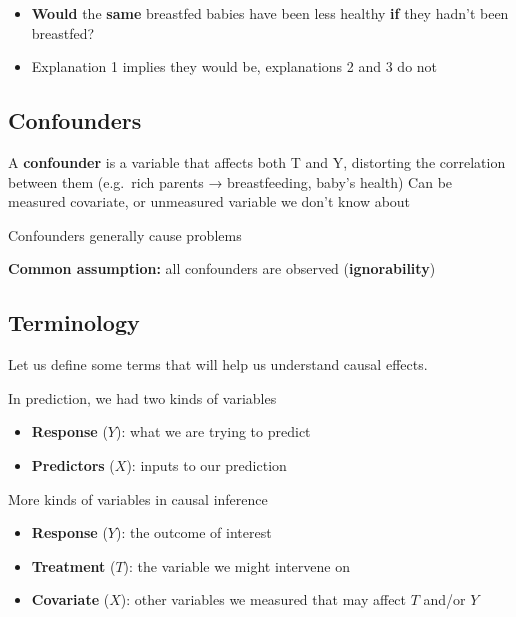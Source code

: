 \documentclass[
  letterpaper,
  DIV=11,
  numbers=noendperiod]{scrreprt}
\providecommand{\tightlist}{%
  \setlength{\itemsep}{0pt}\setlength{\parskip}{0pt}}\usepackage{longtable,booktabs,array}
\begin{document}
\begin{itemize}
\tightlist
\item
  \textbf{Would} the \textbf{same} breastfed babies have been less
  healthy \textbf{if} they hadn't been breastfed?
\item
  Explanation 1 implies they would be, explanations 2 and 3 do not
\end{itemize}

\hypertarget{confounders}{%
\subsection{Confounders}\label{confounders}}

A \textbf{confounder} is a variable that affects both T and Y,
distorting the correlation between them (e.g.~rich parents →
breastfeeding, baby's health) Can be measured covariate, or unmeasured
variable we don't know about

Confounders generally cause problems

\textbf{Common assumption:} all confounders are observed
(\textbf{ignorability})

\hypertarget{terminology}{%
\subsection{Terminology}\label{terminology}}

Let us define some terms that will help us understand causal effects.

In prediction, we had two kinds of variables

\begin{itemize}
\tightlist
\item
  \textbf{Response} (\(Y\)): what we are trying to predict
\item
  \textbf{Predictors} (\(X\)): inputs to our prediction
\end{itemize}

More kinds of variables in causal inference

\begin{itemize}
\tightlist
\item
  \textbf{Response} (\(Y\)): the outcome of interest
\item
  \textbf{Treatment} (\(T\)): the variable we might intervene on
\item
  \textbf{Covariate} (\(X\)): other variables we measured that may
  affect \(T\) and/or \(Y\)
\end{itemize}
\end{document}
